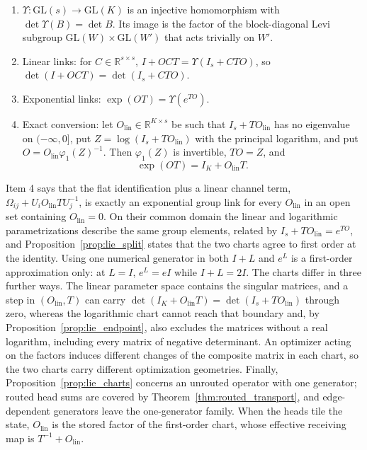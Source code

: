 \documentclass[twoside,11pt]{article}
\begin{document}
\begin{proposition}
\label{prop:lie_charts}
\begin{enumerate}
\item $\Upsilon:\mathrm{GL}(s)\to\mathrm{GL}(K)$ is an injective homomorphism with $\det\Upsilon(B)=\det B$. Its image is the factor of the block-diagonal Levi subgroup $\mathrm{GL}(W)\times\mathrm{GL}(W')$ that acts trivially on $W'$.
\item Linear links: for $C\in\mathbb R^{s\times s}$, $I+OCT=\Upsilon(I_s+CTO)$, so $\det(I+OCT)=\det(I_s+CTO)$.
\item Exponential links: $\exp(OT)=\Upsilon(e^{TO})$.
\item Exact conversion: let $O_{\mathrm{lin}}\in\mathbb R^{K\times s}$ be such that $I_s+TO_{\mathrm{lin}}$ has no eigenvalue on $(-\infty,0]$, put $Z=\log(I_s+TO_{\mathrm{lin}})$ with the principal logarithm, and put $O=O_{\mathrm{lin}}\varphi_1(Z)^{-1}$. Then $\varphi_1(Z)$ is invertible, $TO=Z$, and
\begin{equation}
\exp(OT)=I_K+O_{\mathrm{lin}}T.
\label{eq:lie_conversion}
\end{equation}
\end{enumerate}
\end{proposition}
Item 4 says that the flat identification plus a linear channel term, $\Omega_{ij}+U_iO_{\mathrm{lin}}TU_j^{-1}$, is exactly an exponential group link for every $O_{\mathrm{lin}}$ in an open set containing $O_{\mathrm{lin}}=0$. On their common domain the linear and logarithmic parametrizations describe the same group elements, related by $I_s+TO_{\mathrm{lin}}=e^{TO}$, and Proposition~\ref{prop:lie_split} states that the two charts agree to first order at the identity. Using one numerical generator in both $I+L$ and $e^{L}$ is a first-order approximation only: at $L=I$, $e^{L}=eI$ while $I+L=2I$. The charts differ in three further ways. The linear parameter space contains the singular matrices, and a step in $(O_{\mathrm{lin}},T)$ can carry $\det(I_K+O_{\mathrm{lin}}T)=\det(I_s+TO_{\mathrm{lin}})$ through zero, whereas the logarithmic chart cannot reach that boundary and, by Proposition~\ref{prop:lie_endpoint}, also excludes the matrices without a real logarithm, including every matrix of negative determinant. An optimizer acting on the factors induces different changes of the composite matrix in each chart, so the two charts carry different optimization geometries. Finally, Proposition~\ref{prop:lie_charts} concerns an unrouted operator with one generator; routed head sums are covered by Theorem~\ref{thm:routed_transport}, and edge-dependent generators leave the one-generator family. When the heads tile the state, $O_{\mathrm{lin}}$ is the stored factor of the first-order chart, whose effective receiving map is $T^{-1}+O_{\mathrm{lin}}$.
\end{document}
